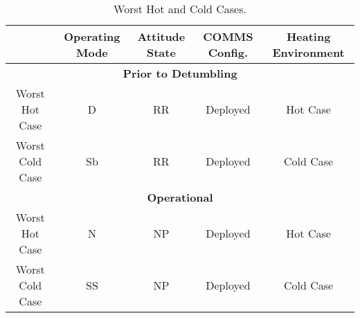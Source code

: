 \begin{table}[H]
    \centering
    \begin{tabular}{ccccc}
        \toprule
        & \textbf{Operating Mode} & \textbf{Attitude State} & \textbf{COMMS Config.} & \textbf{Heating Environment} \\
        \midrule
        \multicolumn{5}{c}{\textbf{Prior to Detumbling}} \\
        Worst Hot Case  & D & RR & Deployed & Hot Case  \\
        Worst Cold Case & Sb  & RR & Deployed & Cold Case \\
        \midrule
        \multicolumn{5}{c}{\textbf{Operational}} \\
        Worst Hot Case  & N  & NP & Deployed & Hot Case  \\
        Worst Cold Case & SS & NP & Deployed & Cold Case \\
        \bottomrule
    \end{tabular}
    \caption{Worst Hot and Cold Cases.}
    \label{tab:worst_cases}
\end{table}